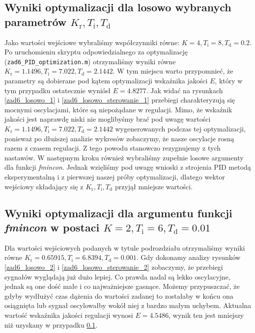 \subsection{Wyniki optymalizacji dla losowo wybranych parametrów $K_{\mathrm{r}}, T_{\mathrm{i}}, T_{\mathrm{d}}$}
\label{zad6_losowo}
Jako wartości wejściowe wybraliśmy współczynniki równe: $K = 4, {T_{\mathrm{i}} = 8}, T_{\mathrm{d}} = \num{0.2}$. Po uruchomieniu skryptu odpowiedzialnego za optymalizację \newline (\verb|zad6_PID_optimization.m|) otrzymaliśmy wyniki równe $K_{\mathrm{r}} = \num{1.1496}, {T_{\mathrm{i}} = 7.022}, T_{\mathrm{d}} = \num{2.1442}$. W tym miejscu warto przypomnieć, że parametry są dobierane pod kątem optymalizacji wskaźnika jakości $E$, który w tym przypadku ostatecznie wyniósł $E=\num{4.8277}$. Jak widać na rysunkach \ref{zad6_losowo_1} i \ref{zad6_losowo_sterowanie_1} przebiegi charakteryzują się mocnymi oscylacjami, które są niepożądane w regulacji. Mimo, że wskaźnik jakości jest naprawdę niski nie moglibyśmy brać pod uwagę wartości $K_{\mathrm{r}} = \num{1.1496}, {T_{\mathrm{i}} = 7.022}, T_{\mathrm{d}} = \num{2.1442}$ wygenerowanych podczas tej optymalizacji, ponieważ po dłuższej analizie wykresów zobaczymy, że nasze oscylacje rosną razem z czasem regulacji. Z tego powodu stanowczo rezygnujemy z tych nastawów. W następnym kroku również wybraliśmy zupełnie losowe argumenty dla funkcji \textit{fmincon}. Jednak wzięliśmy pod uwagę wnioski z strojenia PID metodą eksperymentalną i z pierwszej naszej próby optymalizacji, dlatego wektor wejściowy składający się z $K_{\mathrm{r}}, T_{\mathrm{i}}, T_{\mathrm{d}}$ przyjął mniejsze wartości.

\subsection{Wyniki optymalizacji dla argumentu funkcji \textit{fmincon} w postaci $K = 2, T_{\mathrm{i}} = 6, T_{\mathrm{d}} = 0.01$ }
\label{zad6_pid_najlepszy}
Dla wartości wejściowych podanych w tytule podrozdziału otrzymaliśmy wyniki równe $K_{\mathrm{r}} = \num{0.65915}, {T_{\mathrm{i}} = 6.8394}, {T_{\mathrm{d}} = \num{0.001}}$. Gdy dokonamy analizy rysunków \ref{zad6_losowo_2} i \ref{zad6_losowo_sterowanie_2} zobaczymy, że przebiegi sygnałów wyglądają już dużo lepiej. Co prawda nadal są lekko oscylacyjne, jednak są one dość małe i co najważniejsze gasnące. Możemy przypuszczać, że gdyby wydłużyć czas dążenia do wartości zadanej to zostałaby w końcu ona osiągnięta lub sygnał oscylowałby wokół niej z bardzo małym uchybem. Aktualna wartość wskaźnika jakości regulacji wynosi $E = \num{4.5486}$, wynik ten jest mniejszy niż uzyskany w przypadku \ref{zad6_losowo}.
